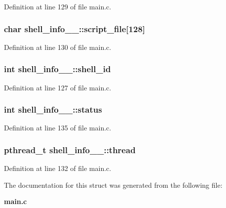 Definition at line 129 of file main.c.
\subsubsection[{script\_\-file}]{\setlength{\rightskip}{0pt plus 5cm}char {\bf shell\_\-info\_\-\_\-::script\_\-file}[128]}\label{structshell__info_____d9ac636d3c2d56701330c7230414225e}




Definition at line 130 of file main.c.
\subsubsection[{shell\_\-id}]{\setlength{\rightskip}{0pt plus 5cm}int {\bf shell\_\-info\_\-\_\-::shell\_\-id}}\label{structshell__info_____a012000f1d1c2d8f85371ceb27a8eb01}




Definition at line 127 of file main.c.
\subsubsection[{status}]{\setlength{\rightskip}{0pt plus 5cm}int {\bf shell\_\-info\_\-\_\-::status}}\label{structshell__info_____519bd295fdd3957fcfebbec9d43b868a}




Definition at line 135 of file main.c.
\subsubsection[{thread}]{\setlength{\rightskip}{0pt plus 5cm}pthread\_\-t {\bf shell\_\-info\_\-\_\-::thread}}\label{structshell__info_____d82964544141706aa86f5a7362f37314}




Definition at line 132 of file main.c.

The documentation for this struct was generated from the following file:\begin{CompactItemize}
\item 
{\bf main.c}\end{CompactItemize}

